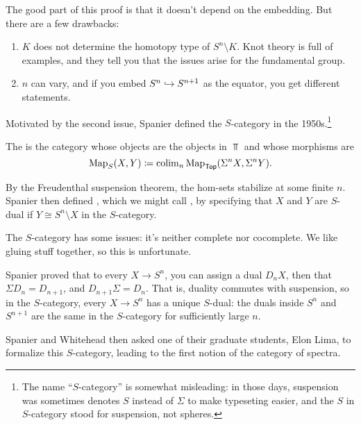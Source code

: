 The good part of this proof is that it doesn't depend on the embedding. But there are a few drawbacks:
\begin{enumerate}
	\item $K$ does not determine the homotopy type of $S^n\setminus K$. Knot theory is full of examples, and they
	tell you that the issues arise for the fundamental group.
	\item $n$ can vary, and if you embed $S^n\hookrightarrow S^{n+1}$ as the equator, you get different statements.
\end{enumerate}
Motivated by the second issue, Spanier defined the $S$-category in the 1950s.\footnote{The name ``$S$-category'' is
somewhat misleading: in those days, suspension was sometimes denotes $S$ instead of $\Sigma$ to make typeseting
easier, and the $S$ in $S$-category stood for suspension, not spheres.}
\begin{defn}
The  is the category whose objects are the objects in $\Top$ and whose morphisms are
\[\operatorname{Map}_S(X, Y) \coloneqq \operatorname{colim}_n\operatorname{Map}_\mathsf{Top}(\Sigma^n X, \Sigma^n Y).\]
\end{defn}
By the Freudenthal suspension theorem, the hom-sets stabilize at some finite $n$. Spanier then defined
, which we might call , by specifying that $X$ and $Y$ are
$S$-dual if $Y\cong S^n\setminus X$ in the $S$-category.
\begin{rem}
The $S$-category has some issues: it's neither complete nor cocomplete. We like gluing stuff together, so this is
unfortunate.
\end{rem}
Spanier proved that to every $X\to S^n$, you can assign a dual $D_n X$, then that $\Sigma D_n = D_{n+1}$, and
$D_{n+1}\Sigma = D_n$. That is, duality commutes with suspension, so in the $S$-category, every $X\to S^n$ has a
unique $S$-dual: the duals inside $S^n$ and $S^{n+1}$ are the same in the $S$-category for sufficiently large $n$.

Spanier and Whitehead then asked one of their graduate students, Elon Lima, to formalize this $S$-category, leading
to the first notion of the category of spectra.
